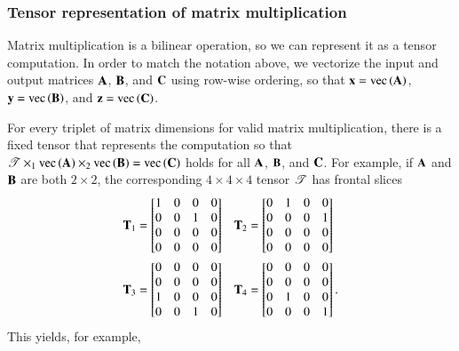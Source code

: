 \documentclass[preprint]{sigplanconf}
\newcommand{\V}[2][]{{\bm{#1\mathbf{\MakeLowercase{#2}}}}}
\newcommand{\M}[2][]{{\bm{#1\mathbf{\MakeUppercase{#2}}}}}
\newcommand{\T}[2][]{\boldsymbol{#1\mathscr{\MakeUppercase{#2}}}}
\begin{document}
\subsubsection{Tensor representation of matrix multiplication}

Matrix multiplication is a bilinear operation, so we can represent it as a tensor computation. 
In order to match the notation above, we vectorize the input and output matrices $\M{A}$, $\M{B}$, and $\M{C}$ using row-wise ordering, so that $\V{x}=\vecmat{\M{A}}$, $\V{y}=\vecmat{\M{B}}$, and $\V{z}=\vecmat{\M{C}}$. 

For every triplet of matrix dimensions for valid matrix multiplication, there is a fixed tensor that represents the computation so that $\T{T} \times_{1} \vecmat{\M{A}} \times_{2} \vecmat{\M{B}} = \vecmat{\M{C}}$ holds for all $\M{A}$, $\M{B}$, and $\M{C}$.
For example, if $\M{A}$ and $\M{B}$ are both $2\times 2$, the corresponding $4\times4\times4$ tensor $\T{T}$ has frontal slices
\begin{align*}
\M{T}_1 &= \begin{bmatrix}
1 & 0 & 0 & 0 \\
0 & 0 & 1 & 0 \\
0 & 0 & 0 & 0 \\
0 & 0 & 0 & 0 \\
\end{bmatrix} &
\M{T}_2 = \begin{bmatrix}
0 & 1 & 0 & 0 \\
0 & 0 & 0 & 1 \\
0 & 0 & 0 & 0 \\
0 & 0 & 0 & 0 \\ 
\end{bmatrix} \phantom{.} \\
\M{T}_3 &= \begin{bmatrix}
0 & 0 & 0 & 0 \\
0 & 0 & 0 & 0 \\
1 & 0 & 0 & 0 \\
0 & 0 & 1 & 0 \\
\end{bmatrix} &
\M{T}_4 = \begin{bmatrix}
0 & 0 & 0 & 0 \\
0 & 0 & 0 & 0 \\
0 & 1 & 0 & 0 \\
0 & 0 & 0 & 1 \\
\end{bmatrix}.
\end{align*}
This yields, for example,
\end{document}
